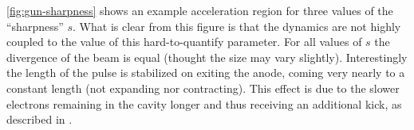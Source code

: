 \ref{fig:gun-sharpness} shows an example acceleration region for three values of the ``sharpness'' $s$.
What is clear from this figure is that the dynamics are not highly coupled to the value of this hard-to-quantify parameter.
For all values of $s$ the divergence of the beam is equal (thought the size may vary slightly).
Interestingly the length of the pulse is stabilized on exiting the anode, coming very nearly to a constant length (not expanding nor contracting).
This effect is due to the slower electrons remaining in the cavity longer and thus receiving an additional kick, as described in \cite{oudheusden_electron_2007}.
